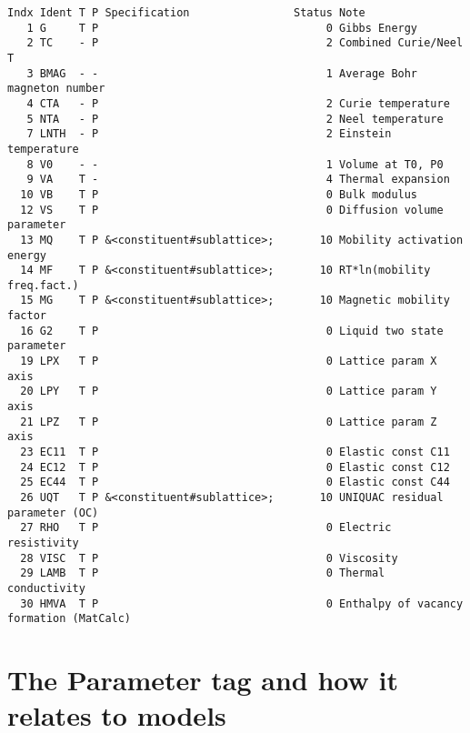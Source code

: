 \documentclass{article}
\begin{document}
\begin{appendices}
\begin{table}[!h]
{\small
\begin{verbatim}
Indx Ident T P Specification                Status Note
   1 G     T P                                   0 Gibbs Energy
   2 TC    - P                                   2 Combined Curie/Neel T
   3 BMAG  - -                                   1 Average Bohr magneton number
   4 CTA   - P                                   2 Curie temperature
   5 NTA   - P                                   2 Neel temperature
   7 LNTH  - P                                   2 Einstein temperature
   8 V0    - -                                   1 Volume at T0, P0
   9 VA    T -                                   4 Thermal expansion
  10 VB    T P                                   0 Bulk modulus
  12 VS    T P                                   0 Diffusion volume parameter
  13 MQ    T P &<constituent#sublattice>;       10 Mobility activation energy
  14 MF    T P &<constituent#sublattice>;       10 RT*ln(mobility freq.fact.)
  15 MG    T P &<constituent#sublattice>;       10 Magnetic mobility factor
  16 G2    T P                                   0 Liquid two state parameter
  19 LPX   T P                                   0 Lattice param X axis
  20 LPY   T P                                   0 Lattice param Y axis
  21 LPZ   T P                                   0 Lattice param Z axis
  23 EC11  T P                                   0 Elastic const C11
  24 EC12  T P                                   0 Elastic const C12
  25 EC44  T P                                   0 Elastic const C44
  26 UQT   T P &<constituent#sublattice>;       10 UNIQUAC residual parameter (OC)
  27 RHO   T P                                   0 Electric resistivity
  28 VISC  T P                                   0 Viscosity
  29 LAMB  T P                                   0 Thermal conductivity
  30 HMVA  T P                                   0 Enthalpy of vacancy formation (MatCalc)
\end{verbatim}
  }
\end{table}
 
\newpage 

\setcounter{equation}{0}
\renewcommand{\theequation}{C\arabic{equation}}
\setcounter{figure}{0}
\renewcommand{\thefigure}{C\arabic{figure}}

\section{The Parameter tag and how it relates to models}\label{sec:partags}


\end{appendices}
\end{document}
